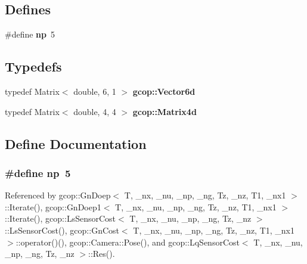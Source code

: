 \subsection*{\-Defines}
\begin{DoxyCompactItemize}
\item 
\#define {\bf np}~5
\end{DoxyCompactItemize}
\subsection*{\-Typedefs}
\begin{DoxyCompactItemize}
\item 
typedef \-Matrix$<$ double, 6, 1 $>$ {\bf gcop\-::\-Vector6d}
\item 
typedef \-Matrix$<$ double, 4, 4 $>$ {\bf gcop\-::\-Matrix4d}
\end{DoxyCompactItemize}


\subsection{\-Define \-Documentation}
\subsubsection[{np}]{\setlength{\rightskip}{0pt plus 5cm}\#define {\bf np}~5}\label{camera_8h_a2bae77253fba36eb9bf93d4c45e4ff79}


\-Referenced by gcop\-::\-Gn\-Doep$<$ T, \-\_\-nx, \-\_\-nu, \-\_\-np, \-\_\-ng, Tz, \-\_\-nz, T1, \-\_\-nx1 $>$\-::\-Iterate(), gcop\-::\-Gn\-Doep1$<$ T, \-\_\-nx, \-\_\-nu, \-\_\-np, \-\_\-ng, Tz, \-\_\-nz, T1, \-\_\-nx1 $>$\-::\-Iterate(), gcop\-::\-Ls\-Sensor\-Cost$<$ T, \-\_\-nx, \-\_\-nu, \-\_\-np, \-\_\-ng, Tz, \-\_\-nz $>$\-::\-Ls\-Sensor\-Cost(), gcop\-::\-Gn\-Cost$<$ T, \-\_\-nx, \-\_\-nu, \-\_\-np, \-\_\-ng, Tz, \-\_\-nz, T1, \-\_\-nx1 $>$\-::operator()(), gcop\-::\-Camera\-::\-Pose(), and gcop\-::\-Lq\-Sensor\-Cost$<$ T, \-\_\-nx, \-\_\-nu, \-\_\-np, \-\_\-ng, Tz, \-\_\-nz $>$\-::\-Res().

